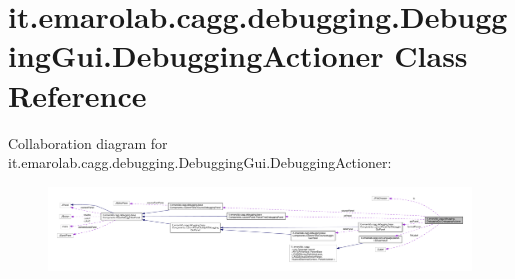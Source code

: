\hypertarget{classit_1_1emarolab_1_1cagg_1_1debugging_1_1DebuggingGui_1_1DebuggingActioner}{\section{it.\-emarolab.\-cagg.\-debugging.\-Debugging\-Gui.\-Debugging\-Actioner Class Reference}
\label{classit_1_1emarolab_1_1cagg_1_1debugging_1_1DebuggingGui_1_1DebuggingActioner}
}


Collaboration diagram for it.\-emarolab.\-cagg.\-debugging.\-Debugging\-Gui.\-Debugging\-Actioner\-:\nopagebreak
\begin{figure}[H]
\begin{center}
\leavevmode
\includegraphics[width=350pt]{classit_1_1emarolab_1_1cagg_1_1debugging_1_1DebuggingGui_1_1DebuggingActioner__coll__graph}
\end{center}
\end{figure}
